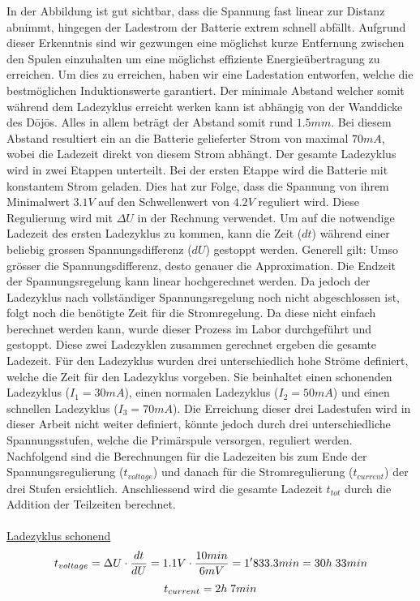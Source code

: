 In der Abbildung ist gut sichtbar, dass die Spannung fast linear zur Distanz abnimmt, hingegen der Ladestrom der Batterie extrem schnell abfällt. Aufgrund dieser Erkenntnis sind wir gezwungen eine möglichst kurze Entfernung zwischen den Spulen einzuhalten um eine möglichst effiziente Energieübertragung zu erreichen. Um dies zu erreichen, haben wir eine Ladestation entworfen, welche die bestmöglichen Induktionswerte garantiert. Der minimale Abstand welcher somit während dem Ladezyklus erreicht werken kann ist abhängig von der Wanddicke des Dōjōs. Alles in allem beträgt der Abstand somit rund $1.5mm$. Bei diesem Abstand resultiert ein an die Batterie gelieferter Strom von maximal $70mA$, wobei die Ladezeit direkt von diesem Strom abhängt. Der gesamte Ladezyklus wird in zwei Etappen unterteilt. Bei der ersten Etappe wird die Batterie mit konstantem Strom geladen. Dies hat zur Folge, dass die Spannung von ihrem Minimalwert $3.1V$ auf den Schwellenwert von $4.2V$ reguliert wird. Diese Regulierung wird mit $\Delta U$ in der Rechnung verwendet. Um auf die notwendige Ladezeit des ersten Ladezyklus zu kommen, kann die Zeit ($dt$) während einer beliebig grossen Spannungsdifferenz ($dU$) gestoppt werden. Generell gilt: Umso grösser die Spannungsdifferenz, desto genauer die Approximation. Die Endzeit der Spannungsregelung kann linear hochgerechnet werden. Da jedoch der Ladezyklus nach vollständiger Spannungsregelung noch nicht abgeschlossen ist, folgt noch die benötigte Zeit für die Stromregelung. Da diese nicht einfach berechnet werden kann, wurde dieser Prozess im Labor durchgeführt und gestoppt. Diese zwei Ladezyklen zusammen gerechnet ergeben die gesamte Ladezeit. Für den Ladezyklus wurden drei unterschiedlich hohe Ströme definiert, welche die Zeit für den Ladezyklus vorgeben. Sie beinhaltet einen schonenden Ladezyklus ($I_{1}=30mA$), einen normalen Ladezyklus ($I_{2}=50mA$) und einen schnellen Ladezyklus ($I_{3}=70mA$). Die Erreichung dieser drei Ladestufen wird in dieser Arbeit nicht weiter definiert, könnte jedoch durch drei unterschiedliche Spannungsstufen, welche die Primärspule versorgen, reguliert werden. Nachfolgend sind die Berechnungen für die Ladezeiten bis zum Ende der Spannungsregulierung ($t_{voltage}$) und danach für die Stromregulierung ($t_{current}$) der drei Stufen ersichtlich. Anschliessend wird die gesamte Ladezeit $t_{tot}$ durch die Addition der Teilzeiten berechnet.
\\
\\
\underline{Ladezyklus schonend}
\begin{equation}
\centering
t_{voltage}= \Delta U \cdot \dfrac{dt}{dU}= 1.1V \cdot \dfrac{10min}{6mV} =1'833.3 min= 30h\thickspace 33min
\label{eq:SchonendSpannung}
\end{equation}
\begin{equation}
\centering
t_{current}= 2h\thickspace 7min
\label{eq:SchonendStrom}
\end{equation}

